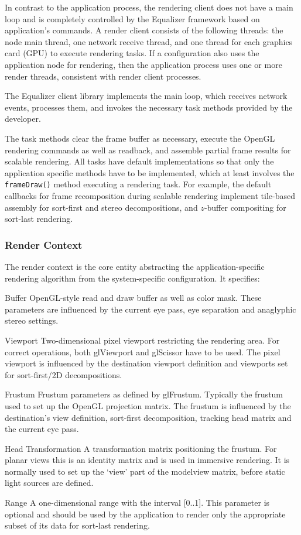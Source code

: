 In contrast to the application process, the rendering client does not have a
main loop and is completely controlled by the Equalizer framework based on
application's commands. A render client consists of the following threads: the
node main thread, one network receive thread, and one thread for each graphics
card (GPU) to execute rendering tasks. If a configuration also uses the
application node for rendering, then the application process uses one or more
render threads, consistent with render client processes.

The Equalizer client library implements the main loop, which receives network
events, processes them, and invokes the necessary task methods provided by the
developer.

The task methods clear the frame buffer as necessary, execute the OpenGL
rendering commands as well as readback, and assemble partial frame results for
scalable rendering. All tasks have default implementations so that only the
application specific methods have to be implemented, which at least involves the
 {\tt frameDraw()} method executing a rendering task. For example, the default
callbacks for frame recomposition during scalable rendering implement tile-based
assembly for sort-first and stereo decompositions, and $z$-buffer compositing
for sort-last rendering.

\subsubsection{Render Context}

The render context is the core entity abstracting the application-specific
rendering algorithm from the system-specific configuration. It specifies:

\begin{compactdesc}
 \item[Buffer] OpenGL-style read and draw buffer as well as color mask.
 These parameters are influenced by the current eye pass, eye
 separation and anaglyphic stereo settings.
 \item[Viewport] Two-dimensional pixel viewport restricting the
 rendering area. For correct operations, both
 \textsf{glViewport} and \textsf{glScissor} have to be used. The pixel
 viewport is influenced by the destination viewport
 definition and viewports set for sort-first/2D decompositions.
 \item[Frustum] Frustum parameters as defined by
 \textsf{glFrustum}. Typically the frustum used to set up the OpenGL projection
 matrix. The frustum is influenced by the destination's view
 definition, sort-first decomposition, tracking head matrix and the current eye pass.
 \item[Head Transformation] A transformation matrix positioning the frustum. For
 planar views this is an identity matrix and is used in immersive rendering.
 It is normally used to set up the `view' part of the modelview matrix, before
 static light sources are defined.
 \item[Range] A one-dimensional range with the interval [0..1]. This parameter is
 optional and should be used by the application to render only the appropriate
 subset of its data for sort-last rendering.
\end{compactdesc}

